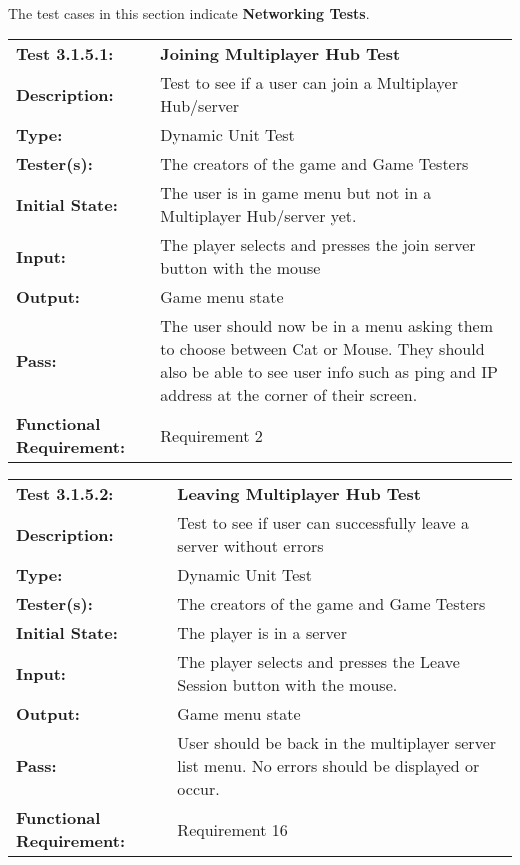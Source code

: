 \documentclass[12pt, titlepage]{article}
\begin{document}
\paragraph{}The test cases in this section indicate \textbf{Networking Tests}.
\begin{mdframed}[linewidth=1pt]
\begin{tabularx}{\textwidth}{@{}p{3cm}X@{}}
{\bf Test 3.1.5.1:} & {\bf Joining Multiplayer Hub Test}\\[\baselineskip]
{\bf Description:} & Test to see if a user can join a Multiplayer Hub/server\\[0.5\baselineskip]
{\bf Type:} & Dynamic Unit Test\\[0.5\baselineskip]
{\bf Tester(s):} & The creators of the game and Game Testers\\[0.5\baselineskip]
{\bf Initial State:} & The user is in game menu but not in a Multiplayer Hub/server yet. \\[0.5\baselineskip]
{\bf Input:} & The player selects and presses the join server button with the mouse \\[0.5\baselineskip]
{\bf Output:} & Game menu state\\[0.5\baselineskip]
{\bf Pass:} & The user should now be in a menu asking them to choose between Cat or Mouse. They should also be able to see user info such as ping and IP address at the corner of their screen. \\[0.5\baselineskip]
{\bf Functional Requirement:} & Requirement 2
\end{tabularx}
\end{mdframed}

\begin{mdframed}[linewidth=1pt]
\begin{tabularx}{\textwidth}{@{}p{3cm}X@{}}
{\bf Test 3.1.5.2:} & {\bf Leaving Multiplayer Hub Test}\\[\baselineskip]
{\bf Description:} & Test to see if user can successfully leave a server without errors\\[0.5\baselineskip]
{\bf Type:} & Dynamic Unit Test\\[0.5\baselineskip]
{\bf Tester(s):} & The creators of the game and Game Testers\\[0.5\baselineskip]
{\bf Initial State:} & The player is in a server\\[0.5\baselineskip]
{\bf Input:} & The player selects and presses the Leave Session button with the mouse. \\[0.5\baselineskip]
{\bf Output:} & Game menu state\\[0.5\baselineskip]
{\bf Pass:} & User should be back in the multiplayer server list menu. No errors should be displayed or occur. \\[0.5\baselineskip]
{\bf Functional Requirement:} & Requirement 16
\end{tabularx}
\end{mdframed}
\end{document}
